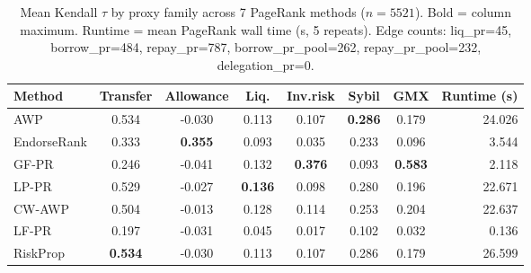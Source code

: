 
\begin{table}[htbp]
\centering
\caption{Mean Kendall $\tau$ by proxy family across 7 PageRank methods ($n=5521$). Bold = column maximum. Runtime = mean PageRank wall time (s, 5 repeats). Edge counts: liq_pr=45, borrow_pr=484, repay_pr=787, borrow_pr_pool=262, repay_pr_pool=232, delegation_pr=0.}
\label{tab:alignment-seven-methods}
\begin{tabular}{lccccccr}
\toprule
Method & Transfer & Allowance & Liq. & Inv.risk & Sybil & GMX & Runtime (s) \\
\midrule
AWP & 0.534 & -0.030 & 0.113 & 0.107 & \textbf{0.286} & 0.179 & 24.026 \\
EndorseRank & 0.333 & \textbf{0.355} & 0.093 & 0.035 & 0.233 & 0.096 & 3.544 \\
GF-PR & 0.246 & -0.041 & 0.132 & \textbf{0.376} & 0.093 & \textbf{0.583} & 2.118 \\
LP-PR & 0.529 & -0.027 & \textbf{0.136} & 0.098 & 0.280 & 0.196 & 22.671 \\
CW-AWP & 0.504 & -0.013 & 0.128 & 0.114 & 0.253 & 0.204 & 22.637 \\
LF-PR & 0.197 & -0.031 & 0.045 & 0.017 & 0.102 & 0.032 & 0.136 \\
RiskProp & \textbf{0.534} & -0.030 & 0.113 & 0.107 & 0.286 & 0.179 & 26.599 \\
\bottomrule
\end{tabular}
\end{table}

